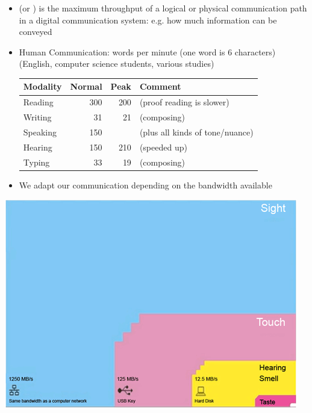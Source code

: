 \documentclass[headrule,footrule]{foils}
\begin{document}
\begin{itemize}
\item {} (or ) is the maximum throughput of
  a logical or physical communication path in a digital communication
  system: e.g. how much information can be conveyed
\item Human Communication: words per minute (one word is 6 characters)
\\ (English, computer science students, various studies)

\begin{tabular}{lrrl}
  Modality & Normal & Peak & Comment\\ \hline 
  Reading            & 300 & 200 &(proof reading is slower)\\
  Writing            & 31 & 21 &(composing) \\ 
  Speaking           & 150 & & (plus all kinds of tone/nuance)\\
  Hearing            & 150 & 210 &(speeded up)  \\
  Typing             & 33  & 19 &(composing) 
\end{tabular}
\item We adapt our communication depending on the bandwidth available

\end{itemize}


\begin{center}
  \includegraphics[height=0.95\textheight]{pics/bandwidth.png}  
\end{center}
\end{document}
